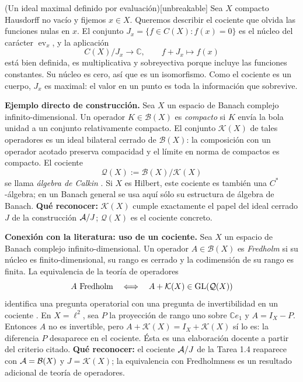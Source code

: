 \begin{cthejemplo}{(Un ideal maximal definido por evaluación)}[unbreakable]
Sea $X$ compacto Hausdorff no vacío y fijemos $x\in X$.
Queremos describir el cociente que olvida las funciones nulas en $x$.
El conjunto $J_x=\{f\in C(X):f(x)=0\}$ es el núcleo del carácter
$\operatorname{ev}_x$, y la aplicación
\[
 C(X)/J_x\longrightarrow\mathbb C,\qquad f+J_x\longmapsto f(x)
\]
está bien definida, es multiplicativa y sobreyectiva porque incluye
las funciones constantes. Su núcleo es cero, así que es un
isomorfismo. Como el cociente es un cuerpo, $J_x$ es maximal:
el valor en un punto es toda la información que sobrevive.
\end{cthejemplo}

\begin{investigacion}
\textbf{Ejemplo directo de construcción.}
Sea $X$ un espacio de Banach complejo infinito-dimensional.
Un operador $K\in\mathcal B(X)$ es \emph{compacto} si
$K$ envía la bola unidad a un conjunto relativamente compacto. El conjunto
$\mathcal K(X)$ de tales operadores es un ideal bilateral cerrado de $\mathcal B(X)$:
la composición con un operador acotado preserva compacidad y el límite en norma
de compactos es compacto. El cociente
\[
 \mathcal Q(X):=\mathcal B(X)/\mathcal K(X)
\]
se llama \emph{álgebra de Calkin} \cite[p.~2]{Karlovich2025}.
Si $X$ es Hilbert, este cociente es también una
$C^*$-álgebra; en un Banach general se usa aquí sólo su estructura de álgebra de Banach.
\textbf{Qué reconocer:} $\mathcal K(X)$ cumple exactamente el papel del ideal
cerrado $J$ de la construcción $\mathcal A/J$; $\mathcal Q(X)$ es el cociente concreto.
\end{investigacion}

\begin{investigacion}
\textbf{Conexión con la literatura: uso de un cociente.}
Sea $X$ un espacio de Banach complejo infinito-dimensional.
Un operador $A\in\mathcal B(X)$ es \emph{Fredholm} si su núcleo es finito-dimensional,
su rango es cerrado y la codimensión de su rango es finita. La equivalencia de la
teoría de operadores
\[
 A\text{ Fredholm}\quad\Longleftrightarrow\quad
 A+\mathcal K(X)\in\operatorname{GL}(\mathcal Q(X))
\]
identifica una pregunta operatorial con una pregunta de invertibilidad en un
cociente \cite[p.~2]{Karlovich2025}. En $X=\ell^2$, sea $P$ la proyección de rango
uno sobre $\mathbb Ce_1$ y $A=I_X-P$. Entonces $A$ no es invertible, pero
$A+\mathcal K(X)=I_X+\mathcal K(X)$ sí lo es: la diferencia $P$ desaparece
en el cociente. Ésta es una elaboración docente a partir del criterio citado.
\textbf{Qué reconocer:} el cociente $\mathcal A/J$ de la Tarea 1.4 reaparece con
$\mathcal A=\mathcal B(X)$ y $J=\mathcal K(X)$; la equivalencia con Fredholmness es
un resultado adicional de teoría de operadores.
\end{investigacion}


